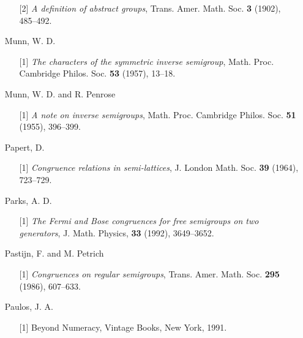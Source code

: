 \documentclass{surv-l}
\numberwithin{equation}{section}
\numberwithin{table}{section}
\numberwithin{figure}{section}
\theoremstyle{definition}
\begin{document}
\begin{enumerate}
\begin{enumerate}
\item[\hypertarget{bib53a}{[2]}] \emph{A definition of abstract groups}, Trans. Amer.
Math. Soc. \textbf{3} (1902), 485--492.
\end{enumerate}

\item[] Munn, W. D.
\begin{enumerate}
\item[\hypertarget{bib54}{[1]}] \emph{The characters of the symmetric inverse
semigroup}, Math. Proc. Cambridge Philos. Soc. \textbf{53}
(1957), 13--18.
\end{enumerate}

\item[] Munn, W. D. and R. Penrose
\begin{enumerate}
\item[\hypertarget{bib55}{[1]}] \emph{A note on inverse semigroups}, Math. Proc.
Cambridge Philos. Soc. \textbf{51} (1955), 396--399.
\end{enumerate}

\item[] Papert, D.
\begin{enumerate}
\item[\hypertarget{bib56}{[1]}] \emph{Congruence relations in semi-lattices}, J.
London Math. Soc. \textbf{39} (1964), 723--729.
\end{enumerate}

\item[] Parks, A. D.
\begin{enumerate}
\item[\hypertarget{bib57}{[1]}] \emph{The Fermi and Bose congruences for free
semigroups on two generators}, J. Math. Physics,
\textbf{33} (1992), 3649--3652.
\end{enumerate}

\item[] Pastijn, F. and M. Petrich
\begin{enumerate}
\item[\hypertarget{bib58}{[1]}] \emph{Congruences on regular semigroups}, Trans. Amer.
Math. Soc. \textbf{295} (1986), 607--633.
\end{enumerate}

\item[] Paulos, J. A.
\begin{enumerate}
\item[\hypertarget{bib59}{[1]}] Beyond Numeracy, Vintage Books, New York, 1991.
\end{enumerate}


\end{enumerate}
\end{document}
